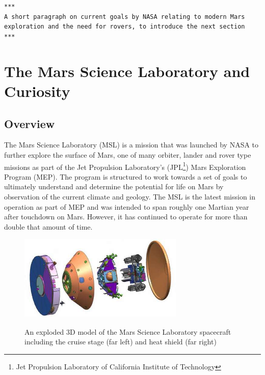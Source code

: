       \texttt{***\\
      A short paragraph on current goals by NASA relating to modern Mars exploration and the need for rovers, to introduce the next section\\
      ***}
      
    
  \section{The Mars Science Laboratory and Curiosity}
    \subsection{Overview}
      The Mars Science Laboratory (MSL) is a mission that was launched by NASA to further explore the surface of Mars, one of many orbiter, lander and rover type missions as part of the Jet Propulsion Laboratory's (JPL\footnote{Jet Propulsion Laboratory of California Institute of Technology}) Mars Exploration Program (MEP). The program is structured to work towards a set of goals to ultimately understand and determine the potential for life on Mars \cite{meptheme} by observation of the current climate and geology. The MSL is the latest mission in operation as part of MEP and was intended to span roughly one Martian year after touchdown on Mars. However, it has continued to operate for more than double that amount of time. 
      
      \begin{figure}[ht]
        \centering
        \includegraphics[width=0.7\textwidth]{figures/mslSpacecraftExplodedView.jpg}
        \label{fig:mslSpacecraftExplodedView}
        \caption[An exploded 3D model of the Mars Science Laboratory spacecraft including the cruise stage (far left) and heat shield (far right)]{An exploded 3D model of the Mars Science Laboratory spacecraft including the cruise stage (far left) and heat shield (far right) \cite{fig:mslSpacecraftExplodedView_cite}}
      \end{figure}
      
